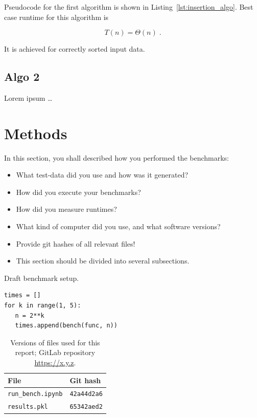 \documentclass[sigconf, nonacm, natbib, screen, balance=False]{acmart}
\begin{document}
Pseudocode for the first algorithm is shown in
Listing~\ref{lst:insertion_algo}. Best case runtime for this algorithm
is

\begin{equation}
  T(n) = \Theta(n) \;.  \label{eq:ins_sort_best}
\end{equation}

It is achieved for correctly sorted input data.

\subsection{Algo 2}\label{sec:algo2}

Lorem ipsum \dots


\section{Methods}\label{sec:methods}

In this section, you shall described how you performed the
benchmarks:
\begin{itemize}
\item What test-data did you use and how was it generated?
\item How did you execute your benchmarks?
\item How did you measure runtimes?
\item What kind of computer did you use, and what software versions?
\item Provide git hashes of all relevant files!
\item This section should be divided into several subsections.
\end{itemize}

\begin{listing}
  \caption{Draft benchmark setup.}
  \label{lst:bench_setup}
  \begin{lstlisting}
times = []
for k in range(1, 5):
   n = 2**k
   times.append(bench(func, n))
  \end{lstlisting}
\end{listing}

\begin{table}
  \caption{Versions of files used for this report; GitLab repository
    \url{https://x.y.z}.}
  \label{tab:hashes}
  \begin{tabular}{ll}
    \hline
    File & Git hash \\\hline
    \verb!run_bench.ipynb! & \verb!42a44d2a6! \\
    \verb!results.pkl! & \verb!65342aed2! \\\hline
  \end{tabular}
\end{table}
\end{document}
